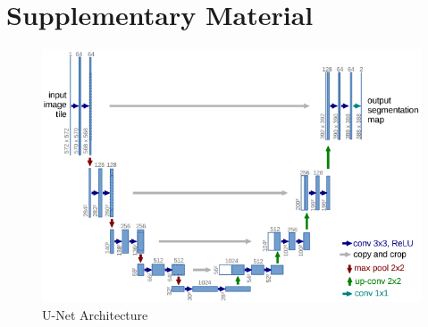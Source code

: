 \documentclass{article}
\begin{document}
\newpage

\section{Supplementary Material}

\begin{figure}[!htb]
    \centering
    \includegraphics[width=\textwidth]{figs/model/UNet_model.png}
    \caption{U-Net Architecture \cite{ronneberger2015u}}
    \label{fig:Unet_model}
\end{figure}
\end{document}
